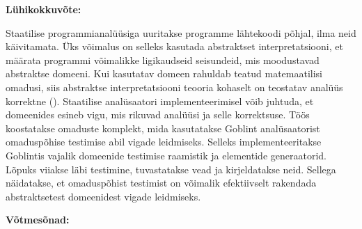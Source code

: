 \documentclass[../thesis.tex]{subfiles}
\begin{document}
\newpage
{}

\noindent\textbf{\large \mytitle}
\vspace*{1ex}

\noindent\textbf{Lühikokkuvõte:} 

\noindent
Staatilise programmianalüüsiga uuritakse programme lähtekoodi põhjal, ilma neid käivitamata.
Üks võimalus on selleks kasutada abstraktset interpretatsiooni, et määrata programmi võimalikke ligikaudseid seisundeid, mis moodustavad abstraktse domeeni. Kui kasutatav domeen rahuldab teatud matemaatilisi omadusi, siis abstraktse interpretatsiooni teooria kohaselt on teostatav analüüs korrektne ().
Staatilise analüsaatori implementeerimisel võib juhtuda, et domeenides esineb vigu, mis rikuvad analüüsi ja selle korrektsuse.
Töös koostatakse omaduste komplekt, mida kasutatakse Goblint analüsaatorist omaduspõhise testimise abil vigade leidmiseks.
Selleks implementeeritakse Goblintis vajalik domeenide testimise raamistik ja elementide generaatorid. Lõpuks viiakse läbi testimine, tuvastatakse vead ja kirjeldatakse neid.
Sellega näidatakse, et omaduspõhist testimist on võimalik efektiivselt rakendada abstraktsetest domeenidest vigade leidmiseks.

\vspace*{1ex}

\noindent\textbf{Võtmesõnad:}\\
\mykeywords

\vspace*{1ex}
\end{document}
